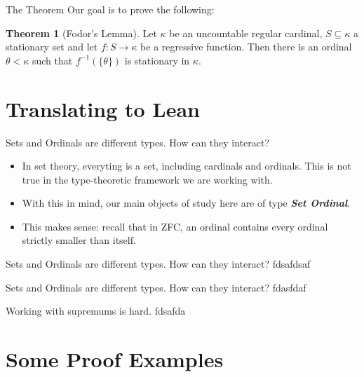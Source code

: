 \documentclass{beamer}
\theoremstyle{definition}
\newtheorem{thm}[subsection]{Theorem}
\begin{document}
\begin{frame}{The Theorem}
    Our goal is to prove the following:
    \begin{thm}[Fodor's Lemma]
       Let $\kappa$ be an uncountable regular cardinal, $S\subseteq\kappa$ a stationary set and let $f:S\rightarrow \kappa$ be a regressive function. Then there is an ordinal $\theta <\kappa$ such that $f^{-1}(\{\theta\})$ is stationary in $\kappa$.
    \end{thm}
\end{frame}

\section{Translating to Lean}

\begin{frame}{Sets and Ordinals are different types. How can they interact?}
    \begin{itemize}
        \item In set theory, everyting is a set, including cardinals and ordinals. This is not true in the type-theoretic framework we are working with. \pause
        \item With this in mind, our main objects of study here are of type \textit{\textbf{Set Ordinal}}. \pause
        \item This makes sense: recall that in ZFC, an ordinal contains every ordinal strictly smaller than itself.
    \end{itemize}
\end{frame}

\begin{frame}{Sets and Ordinals are different types. How can they interact?}
    fdsafdsaf
\end{frame}

\begin{frame}{Sets and Ordinals are different types. How can they interact?}
    fdasfdaf
\end{frame}

\begin{frame}{Working with supremums is hard.}
    fdsafda
\end{frame}

\section{Some Proof Examples}
\end{document}
